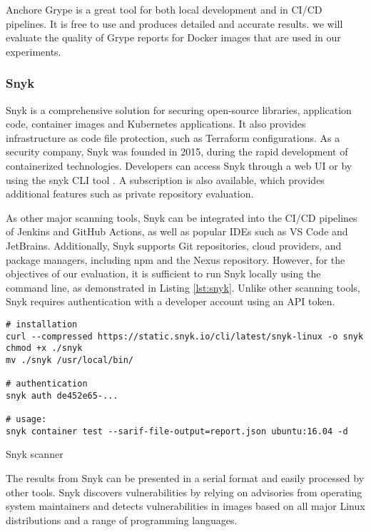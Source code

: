 Anchore Grype is a great tool for both local development and in CI/CD pipelines. It is free to use and produces detailed and accurate results. we will evaluate the quality of Grype reports for Docker images that are used in our experiments.


\subsubsection{Snyk}

Snyk is a comprehensive solution for securing open-source libraries, application code, container images and Kubernetes applications. It also provides infrastructure as code file protection, such as Terraform configurations. As a security company, Snyk was founded in 2015, during the rapid development of containerized technologies. Developers can access Snyk through a web UI or by using the snyk CLI tool \cite{gh:snyk}. A subscription is also available, which provides additional features such as private repository evaluation.


As other major scanning tools, Snyk can be integrated into the CI/CD pipelines of Jenkins and GitHub Actions, as well as popular IDEs such as VS Code and JetBrains. Additionally, Snyk supports Git repositories, cloud providers, and package managers, including npm and the Nexus repository. However, for the objectives of our evaluation, it is sufficient to run Snyk locally using the command line, as demonstrated in Listing \ref{lst:snyk}. Unlike other scanning tools, Snyk requires authentication with a developer account using an API token.

\begin{listing}[htp]
    \centering
    \begin{minipage}{0.9\linewidth}
        \begin{verbatim}
# installation
curl --compressed https://static.snyk.io/cli/latest/snyk-linux -o snyk
chmod +x ./snyk
mv ./snyk /usr/local/bin/

# authentication
snyk auth de452e65-...

# usage:
snyk container test --sarif-file-output=report.json ubuntu:16.04 -d
        \end{verbatim}
    \end{minipage}
    \caption{Snyk scanner}
    \label{lst:snyk}
\end{listing}

The results from Snyk can be presented in a serial format and easily processed by other tools. Snyk discovers vulnerabilities by relying on advisories from operating system maintainers and detects vulnerabilities in images based on all major Linux distributions and a range of programming languages.

